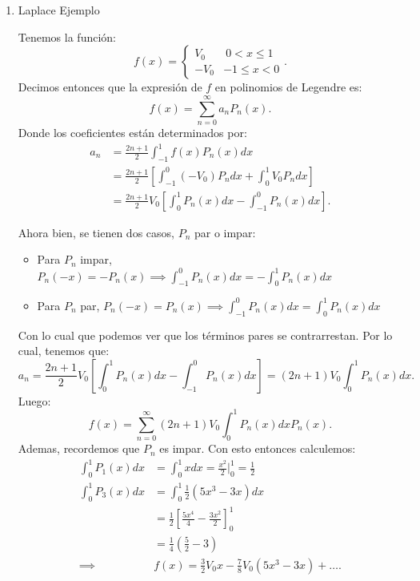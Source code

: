 \documentclass[12pt]{exam}
\begin{document}
\begin{enumerate}
  \item Laplace Ejemplo

          Tenemos la función: \[
	  f\left( x \right) =
      \begin{cases}
	V_0 &\ 0 < x \le 1\\
	-V_0 & -1 \le x < 0
      \end{cases}
      .\]
      Decimos entonces que la expresión de $f$ en polinomios de Legendre es: \[
      f\left( x \right) = \displaystyle \sum_{n=0}^{\infty} a_nP_n\left( x \right)
      .\] Donde los coeficientes están determinados por:
      \begin{align*}
	a_n &= \frac{2n + 1}{2} \int_{-1}^{1} f\left( x \right) P_n\left( x \right) dx \\
	    &= \frac{2n + 1}{2} \left[ \int_{-1}^{0} \left( -V_{0} \right) P_n dx + \int_{0}^{1}V_0P_n dx \right]\\
	    &= \frac{2n + 1}{2}V_0 \left[ \int_{0}^{1}P_n\left( x \right) dx - \int_{-1}^{0}P_n\left( x \right) dx \right]
      .\end{align*}

      Ahora bien, se tienen dos casos, $P_n$ par o impar:
      \begin{itemize}
        \item Para $P_n$ impar, $P_n\left( -x \right) = - P_n\left( x \right) \implies \int_{-1}^{0} P_n\left( x \right) dx = - \int_0^{1}P_n\left( x \right) dx$
	\item Para $P_n$ par, $P_n\left( -x \right) = P_n\left( x \right) \implies \int_{-1}^{0}P_n\left( x \right) dx = \int_0^{1} P_n\left( x \right) dx$
      \end{itemize}
      Con lo cual que podemos ver que los términos pares se contrarrestan. Por lo cual, tenemos que: \[
	a_n = \frac{2n + 1}{2}V_0 \left[ \int_0^{1}P_n\left( x \right) dx - \int_{-1}^{0}P_n\left( x \right) dx \right] = \left( 2n + 1 \right) V_0 \int_0^{1}P_n\left( x \right) dx
      .\] Luego: \[
      f\left( x \right)  = \sum_{n=0}^{\infty} \left( 2n + 1 \right) V_0 \int_{0}^{1}P_n\left( x \right) dx P_n\left( x \right)
      .\] Ademas, recordemos que $P_n$ es impar. Con esto entonces calculemos:
      \begin{align*}
	\int_{0}^{1} P_1 \left( x \right) dx &= \int_{0}^{1}x dx = \frac{x^2}{2} |_{0}^{1} = \frac{1}{2}\\
	\int_{0}^{1}P_3\left( x \right) dx &= \int_{0}^{1}\frac{1}{2}\left( 5x^{3}- 3x \right) dx\\
	&=  \frac{1}{2}\left[ \frac{5x^{4}}{4} - \frac{3x^2}{2} \right]_0^{1}\\
	&= \frac{1}{4}\left( \frac{5}{2} - 3 \right)  \\
	\implies& f\left( x \right) = \frac{3}{2}V_0 x - \frac{7}{8}V_0\left( 5x^{3}- 3x \right) + \ldots
      .\end{align*}


\end{enumerate}
\end{document}
